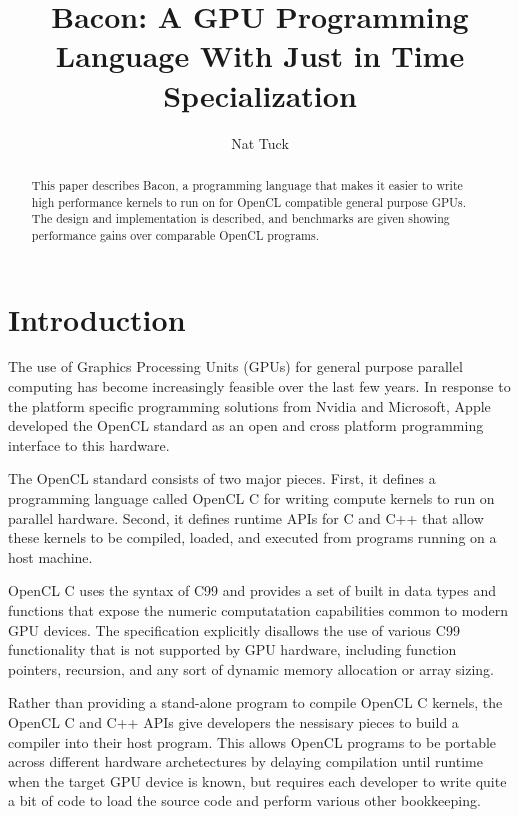 \documentclass{llncs}
\begin{document}
\title{Bacon: A GPU Programming Language With Just in Time Specialization}

\author{Nat Tuck}


\maketitle

\begin{abstract}

This paper describes Bacon, a programming language that makes it
easier to write high performance kernels to run on for OpenCL
compatible general purpose GPUs. The design and implementation is
described, and benchmarks are given showing performance gains over
comparable OpenCL programs.

\end{abstract}

\section{Introduction}

The use of Graphics Processing Units (GPUs) for general purpose
parallel computing has become increasingly feasible over the last few
years. In response to the platform specific programming solutions from
Nvidia and Microsoft, Apple developed the OpenCL standard as an open and
cross platform programming interface to this hardware.

The OpenCL standard consists of two major pieces. First, it defines a
programming language called OpenCL C for writing compute kernels to
run on parallel hardware. Second, it defines runtime APIs for C and
C++ that allow these kernels to be compiled, loaded, and executed from
programs running on a host machine.

OpenCL C uses the syntax of C99 and provides a set of built in data
types and functions that expose the numeric computatation capabilities
common to modern GPU devices. The specification explicitly disallows
the use of various C99 functionality that is not supported by GPU
hardware, including function pointers, recursion, and any sort of
dynamic memory allocation or array sizing. 

Rather than providing a stand-alone program to compile OpenCL C
kernels, the OpenCL C and C++ APIs give developers the nessisary
pieces to build a compiler into their host program. This allows OpenCL
programs to be portable across different hardware archetectures by
delaying compilation until runtime when the target GPU device is
known, but requires each developer to write quite a bit of code to
load the source code and perform various other bookkeeping.
\end{document}
